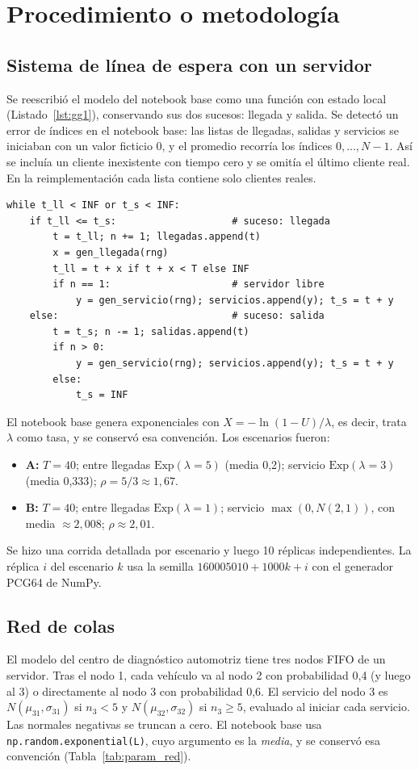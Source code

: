 \documentclass[11pt,a4paper]{article}
\begin{document}
\section{Procedimiento o metodología}
\subsection{Sistema de línea de espera con un servidor}
Se reescribió el modelo del notebook base como una función con estado local
(Listado~\ref{lst:gg1}), conservando sus dos sucesos: llegada y salida. Se detectó un error
de índices en el notebook base: las listas de llegadas, salidas y servicios se iniciaban con
un valor ficticio 0, y el promedio recorría los índices $0,\dots,N-1$. Así se incluía un
cliente inexistente con tiempo cero y se omitía el último cliente real. En la
reimplementación cada lista contiene solo clientes reales.

\begin{lstlisting}[caption={Bucle principal de la G/G/1 (programación de sucesos).},label=lst:gg1]
while t_ll < INF or t_s < INF:
    if t_ll <= t_s:                    # suceso: llegada
        t = t_ll; n += 1; llegadas.append(t)
        x = gen_llegada(rng)
        t_ll = t + x if t + x < T else INF
        if n == 1:                     # servidor libre
            y = gen_servicio(rng); servicios.append(y); t_s = t + y
    else:                              # suceso: salida
        t = t_s; n -= 1; salidas.append(t)
        if n > 0:
            y = gen_servicio(rng); servicios.append(y); t_s = t + y
        else:
            t_s = INF
\end{lstlisting}

El notebook base genera exponenciales con $X=-\ln(1-U)/\lambda$, es decir, trata $\lambda$
como tasa, y se conservó esa convención. Los escenarios fueron:
\begin{itemize}
 \item \textbf{A:} $T=40$; entre llegadas $\text{Exp}(\lambda=5)$ (media 0,2); servicio
 $\text{Exp}(\lambda=3)$ (media 0,333); $\rho=5/3\approx1{,}67$.
 \item \textbf{B:} $T=40$; entre llegadas $\text{Exp}(\lambda=1)$; servicio
 $\max(0,N(2,1))$, con media $\approx2{,}008$; $\rho\approx2{,}01$.
\end{itemize}
Se hizo una corrida detallada por escenario y luego 10 réplicas independientes. La réplica
$i$ del escenario $k$ usa la semilla $160005010+1000k+i$ con el generador PCG64 de NumPy.

\subsection{Red de colas}
El modelo del centro de diagnóstico automotriz \cite[Sec.~5.5.2]{rios2008} tiene tres nodos
FIFO de un servidor. Tras el nodo 1, cada vehículo va al nodo 2 con probabilidad 0,4 (y
luego al 3) o directamente al nodo 3 con probabilidad 0,6. El servicio del nodo 3 es
$N(\mu_{31},\sigma_{31})$ si $n_3<5$ y $N(\mu_{32},\sigma_{32})$ si $n_3\ge5$, evaluado al
iniciar cada servicio. Las normales negativas se truncan a cero. El notebook base usa
\texttt{np.random.exponential(L)}, cuyo argumento es la \emph{media}, y se conservó esa
convención (Tabla~\ref{tab:param_red}).
\end{document}
